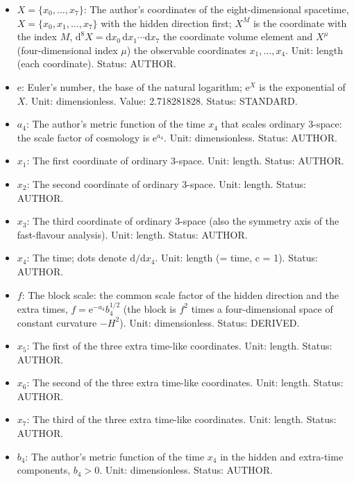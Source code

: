 \documentclass[
  10pt,
]{article}
\begin{document}
\begin{itemize}
  \(N_1, N_2, \dots\)), running over \(x_0, \dots, x_7\); a repeated
  index is summed. Status: STANDARD.
\item
  \(X = \{x_0, \dots, x_7\}\): The author's coordinates of the
  eight-dimensional spacetime, \(X = \{x_0, x_1, \dots, x_7\}\) with the
  hidden direction first; \(X^M\) is the coordinate with the index
  \(M\),
  \(\mathrm{d}^8X = \mathrm{d}x_0\,\mathrm{d}x_1\cdots\mathrm{d}x_7\)
  the coordinate volume element and \(X^\mu\) (four-dimensional index
  \(\mu\)) the observable coordinates \(x_1, \dots, x_4\). Unit: length
  (each coordinate). Status: AUTHOR.
\item
  \(\mathrm{e}\): Euler's number, the base of the natural logarithm;
  \(\mathrm{e}^{X}\) is the exponential of \(X\). Unit: dimensionless.
  Value: 2.718281828. Status: STANDARD.
\item
  \(a_4\): The author's metric function of the time \(x_4\) that scales
  ordinary 3-space: the scale factor of cosmology is
  \(\mathrm{e}^{a_4}\). Unit: dimensionless. Status: AUTHOR.
\item
  \(x_1\): The first coordinate of ordinary 3-space. Unit: length.
  Status: AUTHOR.
\item
  \(x_2\): The second coordinate of ordinary 3-space. Unit: length.
  Status: AUTHOR.
\item
  \(x_3\): The third coordinate of ordinary 3-space (also the symmetry
  axis of the fast-flavour analysis). Unit: length. Status: AUTHOR.
\item
  \(x_4\): The time; dots denote \(\mathrm{d}/\mathrm{d}x_4\). Unit:
  length (= time, c = 1). Status: AUTHOR.
\item
  \(f\): The block scale: the common scale factor of the hidden
  direction and the extra times, \(f = \mathrm{e}^{-a_4}b_4^{1/2}\) (the
  block is \(f^2\) times a four-dimensional space of constant curvature
  \(-H^2\)). Unit: dimensionless. Status: DERIVED.
\item
  \(x_5\): The first of the three extra time-like coordinates. Unit:
  length. Status: AUTHOR.
\item
  \(x_6\): The second of the three extra time-like coordinates. Unit:
  length. Status: AUTHOR.
\item
  \(x_7\): The third of the three extra time-like coordinates. Unit:
  length. Status: AUTHOR.
\item
  \(b_4\): The author's metric function of the time \(x_4\) in the
  hidden and extra-time components, \(b_4 > 0\). Unit: dimensionless.
  Status: AUTHOR.

\end{itemize}
\end{document}
